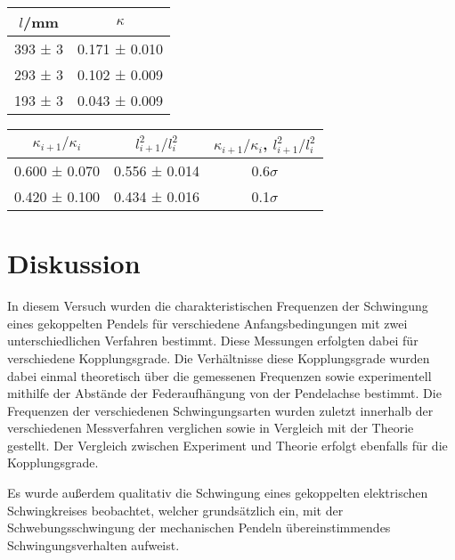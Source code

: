 \documentclass[12pt,a4paper,german]{scrartcl}
\numberwithin{equation}{section}
\begin{document}
  \begin{center}
    \begin{tabular}{c|c}
      $l$/mm & $\kappa$ \\
      \hline
      393 ± 3 & 0.171 ± 0.010 \\
      293 ± 3 & 0.102 ± 0.009 \\
      193 ± 3 & 0.043 ± 0.009
    \end{tabular}
    \label{table_beats_coupling_factors}
  \end{center}

  \begin{center}
    \begin{tabular}{c|c|c}
      $\kappa_{i+1} / \kappa_i$ & $l_{i+1}^2/l_i^2$ & $\kappa_{i+1} / \kappa_i$, $l_{i+1}^2/l_i^2$ \\
      \hline
      0.600 ± 0.070 & 0.556 ± 0.014 & 0.6$\sigma$ \\
      0.420 ± 0.100 & 0.434 ± 0.016 & 0.1$\sigma$
    \end{tabular}
    \label{table_beats_coupling_factors_ratio}
  \end{center}

  \section{Diskussion}
  In diesem Versuch wurden die charakteristischen Frequenzen der Schwingung eines gekoppelten Pendels für verschiedene Anfangsbedingungen mit zwei unterschiedlichen Verfahren bestimmt.
  Diese Messungen erfolgten dabei für verschiedene Kopplungsgrade.
  Die Verhältnisse diese Kopplungsgrade wurden dabei einmal theoretisch über die gemessenen Frequenzen sowie experimentell mithilfe der Abstände der Federaufhängung von der Pendelachse bestimmt.
  Die Frequenzen der verschiedenen Schwingungsarten wurden zuletzt innerhalb der verschiedenen Messverfahren verglichen sowie in Vergleich mit der Theorie gestellt.
  Der Vergleich zwischen Experiment und Theorie erfolgt ebenfalls für die Kopplungsgrade.

  Es wurde außerdem qualitativ die Schwingung eines gekoppelten elektrischen Schwingkreises beobachtet, welcher grundsätzlich ein, mit der Schwebungsschwingung der mechanischen Pendeln übereinstimmendes Schwingungsverhalten aufweist.
\end{document}
